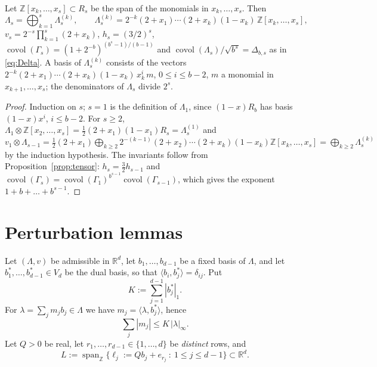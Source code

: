 \documentclass[12pt]{article}
\newcommand{\Z}{\mathbb{Z}}
\newcommand{\R}{\mathbb{R}}
\newcommand{\covol}{\operatorname{covol}}
\newcommand{\Lat}{\Lambda}
\begin{document}
\begin{proposition}\label{prop:closed}
Let $\Z[x_k,\dots,x_s]\subset R_s$ be the span of the monomials in $x_k,\dots,x_s$. Then
\[
\Lat_s=\bigoplus_{k=1}^{s}\Lat_s^{(k)},\qquad
\Lat_s^{(k)}=2^{-k}(2+x_1)\cdots(2+x_k)(1-x_k)\,\Z[x_k,\dots,x_s],
\]
$v_s=2^{-s}\prod_{k=1}^{s}(2+x_k)$, $h_s=(3/2)^s$, $\covol(\Gamma_s)=(1+2^{-b})^{(b^s-1)/(b-1)}$ and $\covol(\Lat_s)/\sqrt{b^s}=\Delta_{b,s}$ as in
\eqref{eq:Delta}. A basis of $\Lat_s^{(k)}$ consists of the vectors
$2^{-k}(2+x_1)\cdots(2+x_k)(1-x_k)\,x_k^i\,m$, $0\le i\le b-2$, $m$ a monomial in $x_{k+1},\dots,x_s$; the
denominators of $\Lat_s$ divide $2^s$.
\end{proposition}
\begin{proof}
Induction on $s$; $s=1$ is the definition of $\Lat_1$, since $(1-x)R_b$ has basis $(1-x)x^i$, $i\le b-2$.
For $s\ge2$, $\Lat_1\otimes\Z[x_2,\dots,x_s]=\frac12(2+x_1)(1-x_1)R_s=\Lat_s^{(1)}$ and
$v_1\otimes\Lat_{s-1}=\frac12(2+x_1)\bigoplus_{k\ge2}2^{-(k-1)}(2+x_2)\cdots(2+x_k)(1-x_k)\Z[x_k,\dots,x_s]
=\bigoplus_{k\ge2}\Lat_s^{(k)}$ by the induction hypothesis. The invariants follow from
Proposition~\ref{prop:tensor}: $h_s=\frac32h_{s-1}$ and
$\covol(\Gamma_s)=\covol(\Gamma_1)^{b^{s-1}}\covol(\Gamma_{s-1})$, which gives the exponent $1+b+\dots+b^{s-1}$.
\end{proof}

\section{Perturbation lemmas}\label{sec:perturb}

Let $(\Lat,v)$ be admissible in $\R^d$, let $b_1,\dots,b_{d-1}$ be a fixed basis of $\Lat$, and let
$b_1^*,\dots,b_{d-1}^*\in V_d$ be the dual basis, so that $\langle b_i,b_j^*\rangle=\delta_{ij}$. Put
\begin{equation}\label{eq:K}
 K:=\sum_{j=1}^{d-1}|b_j^*|_1 .
\end{equation}
For $\lambda=\sum_jm_jb_j\in\Lat$ we have $m_j=\langle\lambda,b_j^*\rangle$, hence
\begin{equation}\label{eq:coeff}
 \sum_j|m_j|\le K\,|\lambda|_\infty .
\end{equation}
Let $Q>0$ be real, let $r_1,\dots,r_{d-1}\in\{1,\dots,d\}$ be \emph{distinct} rows, and
\[
 L:=\operatorname{span}_\Z\{\ell_j:=Qb_j+e_{r_j}\ :\ 1\le j\le d-1\}\subset\R^d .
\]
\end{document}
